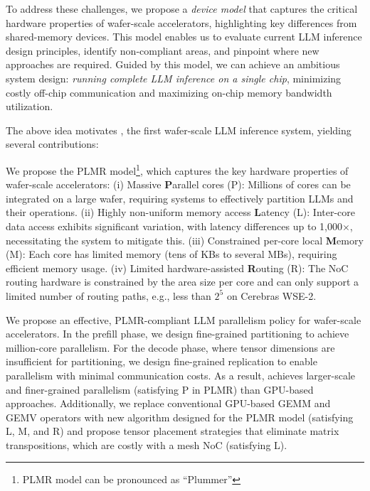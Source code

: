 To address these challenges, we propose a \emph{device model} that captures the critical hardware properties of wafer-scale accelerators, highlighting key differences from shared-memory devices. This model enables us to evaluate current LLM inference design principles, identify non-compliant areas, and pinpoint where new approaches are required. Guided by this model, we can achieve an ambitious system design: \emph{running complete LLM inference on a single chip}, minimizing costly off-chip communication and maximizing on-chip memory bandwidth utilization.

The above idea motivates \sys, the first wafer-scale LLM inference system, yielding several contributions:

We propose the PLMR model\footnote{PLMR model can be pronounced as “Plummer” }, which captures the key hardware properties of wafer-scale accelerators:
(i) Massive \textbf{P}arallel cores (P): Millions of cores can be integrated on a large wafer, requiring systems to effectively partition LLMs and their operations.
(ii) Highly non-uniform memory access \textbf{L}atency (L): Inter-core data access exhibits significant variation, with latency differences up to 1,000$\times$, necessitating the system to mitigate this.
(iii) Constrained per-core local \textbf{M}emory (M): Each core has limited memory (tens of KBs to several MBs), requiring efficient memory usage.
(iv) Limited hardware-assisted \textbf{R}outing (R): The NoC routing hardware is constrained by the area size per core and can only support a limited number of routing paths, e.g., less than $2^5$ on Cerebras WSE-2.

We propose an effective, PLMR-compliant LLM parallelism policy for wafer-scale accelerators. %
In the prefill phase, we design fine-grained partitioning to achieve million-core parallelism. For the decode phase, where tensor dimensions are insufficient for partitioning, we design fine-grained replication to enable parallelism with minimal communication costs. As a result, \sys achieves larger-scale and finer-grained parallelism (satisfying P in PLMR) than GPU-based approaches. Additionally, we replace conventional GPU-based GEMM and GEMV operators %
with new algorithm designed for the PLMR model (satisfying L, M, and R) and propose tensor placement strategies that eliminate matrix transpositions, which are costly with a mesh NoC (satisfying L). 

